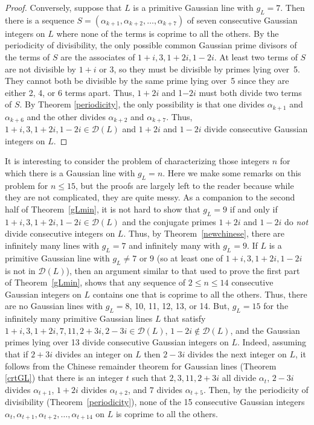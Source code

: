 \documentclass[11pt]{article}
\newcommand{\DL}{{\mathcal{D}}(L)}
\begin{document}
\begin{proof}
Conversely, suppose that $L$ is a primitive Gaussian line with  $g_L=7$. Then there is a sequence 
$S=(\alpha_{k+1}, \alpha_{k+2}, \ldots, \alpha_{k+7})$ of seven consecutive Gaussian integers on $L$ where none of the terms  is coprime to all the others. By the periodicity of divisibility, the only possible common Gaussian prime divisors of the terms of $S$ are the associates of  $1+i, 3, 1+2i,1-2i$.
At least two terms of $S$ are not divisible by $1+i$ or $3$, so they must be divisible by primes lying over~5.
They cannot both be divisible by the same prime lying over~5 since they are either 2, 4, or 6 terms apart.  Thus, $1+2i$ and 1$-2i$ must both divide two terms of $S$.  By Theorem \ref{periodicity}, the only possibility is that one divides
 $\alpha_{k+1}$ and $\alpha_{k+6}$ and the other divides 
 $\alpha_{k+2}$ and $\alpha_{k+7}$.  Thus, $1+i, 3, 1+2i,1-2i\in\DL$ and $1+2i$ and $1-2i$ divide consecutive Gaussian integers on $L$.
\end{proof}


  It is interesting to consider the problem of characterizing those integers $n$ for which there is a Gaussian line with $g_L=n$. Here we make some remarks on this problem for $n\leq 15$, but the proofs are largely left to the reader because while they are not complicated, they are quite messy.  As a companion to the second half of Theorem~\ref{gLmin}, it is not hard to show that $g_L=9$ if and only if
$1+i, 3, 1+2i,1-2i\in\DL$ and the conjugate primes $1+2i$ and $1-2i$ do {\em not} divide consecutive integers on $L$. Thus, by 
Theorem~\ref{newchinese}, there are infinitely many lines with $g_L=7$ and infinitely many with $g_L=9$.  
If $L$ is a primitive Gaussian line with 
$g_L\neq 7$ or $9$ (so at least one of  $1+i, 3, 1+2i,1-2i$ is not in $\DL$), then an argument similar to that used to prove the first part of Theorem~\ref{gLmin}, shows that any sequence of  $2\leq n\leq 14$ consecutive Gaussian integers on $L$ contains one that is coprime to all the others.  Thus, there are no Gaussian lines with $g_L= 8$, 10, 11, 12, 13, or 14.  But, $g_L=15$ for the infinitely many primitive Gaussian lines $L$ that satisfy $1+i, 3, 1+2i, 7, 11, 2+3i, 2-3i \in\DL$,
$1-2i\not\in\DL$, and the Gaussian primes lying over 13 divide consecutive Gaussian integers on $L$.  Indeed, assuming  that if $2+3i$ divides an integer on $L$  then $2-3i$ divides the next integer on $L$, it follows from the  Chinese remainder theorem for Gaussian lines (Theorem 
\ref{crtGL}) that there is an integer $t$ such that $2, 3, 11, 2+3i$ all divide $\alpha_t$, $2-3i$ divides $\alpha_{t+1}$, $1+2i$ divides $\alpha_{t+2}$, and $7$ divides $\alpha_{t+5}$.  Then, by the periodicity of divisibility (Theorem~\ref{periodicity}), none of the 15 consecutive Gaussian integers
 $\alpha_{t}, \alpha_{t+1}, \alpha_{t+2}, \ldots , \alpha_{t+14}$  on $L$  is coprime to all the others.  
\bigskip
\end{document}
